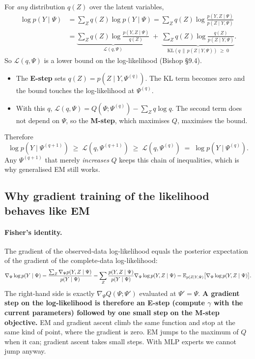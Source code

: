 For \emph{any} distribution $q(Z)$ over the latent variables,
\begin{align}
\log p(Y\mid\Psi)&=\sum_Z q(Z)\log p(Y\mid\Psi)=\sum_Zq(Z)\log\frac{p(Y,Z\mid\Psi)}{p(Z\mid Y,\Psi)}\nonumber\\
&=\underbrace{\sum_Zq(Z)\log\frac{p(Y,Z\mid\Psi)}{q(Z)}}_{\mathcal L(q,\Psi)}\;+\;\underbrace{\sum_Zq(Z)\log\frac{q(Z)}{p(Z\mid Y,\Psi)}}_{\mathrm{KL}(q\,\|\,p(Z\mid Y,\Psi))\;\ge\;0}.
\end{align}
So $\mathcal L(q,\Psi)$ is a lower bound on the log-likelihood (Bishop \S9.4).
\begin{itemize}
  \item The \textbf{E-step} sets $q(Z)=p(Z\mid Y,\Psi^{(q)})$. The KL term becomes zero and the bound touches the log-likelihood at $\Psi^{(q)}$.
  \item With this $q$, $\mathcal L(q,\Psi)=Q(\Psi;\Psi^{(q)})-\sum_Zq\log q$. The second term does not depend on $\Psi$, so the \textbf{M-step}, which maximises $Q$, maximises the bound.
\end{itemize}
Therefore
\begin{equation}
\log p(Y\mid\Psi^{(q+1)})\;\ge\;\mathcal L(q,\Psi^{(q+1)})\;\ge\;\mathcal L(q,\Psi^{(q)})\;=\;\log p(Y\mid\Psi^{(q)}).
\end{equation}
Any $\Psi^{(q+1)}$ that merely \emph{increases} $Q$ keeps this chain of inequalities, which is why generalised EM still works.

\subsection{Why gradient training of the likelihood behaves like EM}

\paragraph{Fisher's identity.} The gradient of the observed-data log-likelihood equals the posterior expectation of the gradient of the complete-data log-likelihood:
\begin{equation}
\nabla_\Psi\log p(Y\mid\Psi)=\frac{\sum_Z\nabla_\Psi p(Y,Z\mid\Psi)}{p(Y\mid\Psi)}=\sum_Z\frac{p(Y,Z\mid\Psi)}{p(Y\mid\Psi)}\nabla_\Psi\log p(Y,Z\mid\Psi)=\mathbb{E}_{p(Z\mid Y,\Psi)}\big[\nabla_\Psi\log p(Y,Z\mid\Psi)\big].
\end{equation}
The right-hand side is exactly $\nabla_\Psi Q(\Psi;\Psi')$ evaluated at $\Psi'=\Psi$. \textbf{A gradient step on the log-likelihood is therefore an E-step (compute $\gamma$ with the current parameters) followed by one small step on the M-step objective.} EM and gradient ascent climb the same function and stop at the same kind of point, where the gradient is zero. EM jumps to the maximum of $Q$ when it can; gradient ascent takes small steps. With MLP experts we cannot jump anyway.

